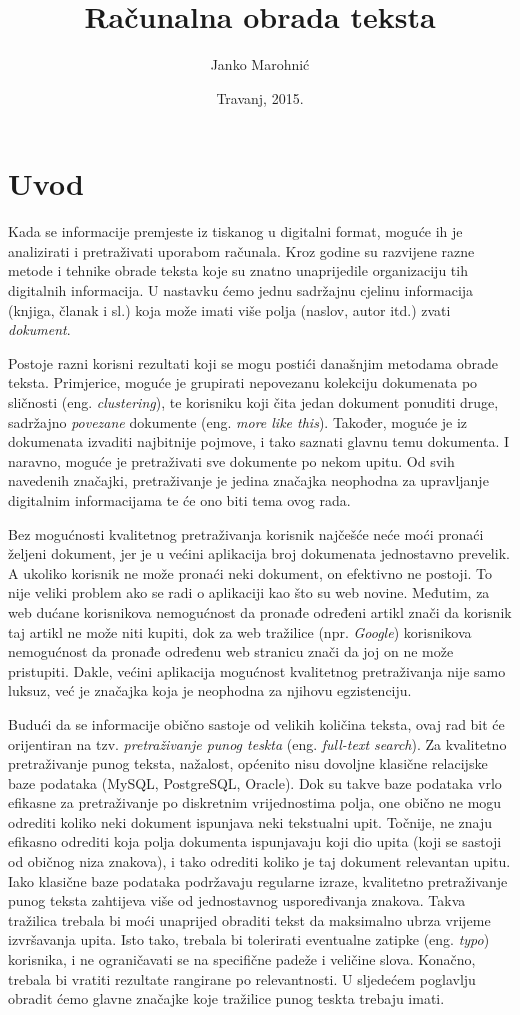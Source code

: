 \documentclass[a4paper,twoside,12pt]{scrreprt}
\title{Računalna obrada teksta}
\author{Janko Marohnić}
\date{Travanj, 2015.}
\begin{document}
\frontmatter

\chapter{Uvod}

Kada se informacije premjeste iz tiskanog u digitalni format, moguće ih je analizirati i pretraživati uporabom računala. Kroz godine su razvijene razne metode i tehnike obrade teksta koje su znatno unaprijedile organizaciju tih digitalnih informacija. U nastavku ćemo jednu sadržajnu cjelinu informacija (knjiga, članak i sl.) koja može imati više polja (naslov, autor itd.) zvati \textit{dokument}.

Postoje razni korisni rezultati koji se mogu postići današnjim metodama obrade teksta. Primjerice, moguće je grupirati nepovezanu kolekciju dokumenata po sličnosti (eng. \textit{clustering}), te korisniku koji čita jedan dokument ponuditi druge, sadržajno \textit{povezane} dokumente (eng. \textit{more like this}). Također, moguće je iz dokumenata izvaditi najbitnije pojmove, i tako saznati glavnu temu dokumenta. I naravno, moguće je pretraživati sve dokumente po nekom upitu. Od svih navedenih značajki, pretraživanje je jedina značajka neophodna za upravljanje digitalnim informacijama te će ono biti tema ovog rada.

Bez mogućnosti kvalitetnog pretraživanja korisnik najčešće neće moći pronaći željeni dokument, jer je u većini aplikacija broj dokumenata jednostavno prevelik. A ukoliko korisnik ne može pronaći neki dokument, on efektivno ne postoji. To nije veliki problem ako se radi o aplikaciji kao što su web novine. Međutim, za web dućane korisnikova nemogućnost da pronađe određeni artikl znači da korisnik taj artikl ne može niti kupiti, dok za web tražilice (npr. \textit{Google}) korisnikova nemogućnost da pronađe određenu web stranicu znači da joj on ne može pristupiti. Dakle, većini aplikacija mogućnost kvalitetnog pretraživanja nije samo luksuz, već je značajka koja je neophodna za njihovu egzistenciju.

Budući da se informacije obično sastoje od velikih količina teksta, ovaj rad bit će orijentiran na tzv. \textit{pretraživanje punog teskta} (eng. \textit{full-text search}). Za kvalitetno pretraživanje punog teksta, nažalost, općenito nisu dovoljne klasične relacijske baze podataka (MySQL, PostgreSQL, Oracle). Dok su takve baze podataka vrlo efikasne za pretraživanje po diskretnim vrijednostima polja, one obično ne mogu odrediti koliko neki dokument ispunjava neki tekstualni upit. Točnije, ne znaju efikasno odrediti koja polja dokumenta ispunjavaju koji dio upita (koji se sastoji od običnog niza znakova), i tako odrediti koliko je taj dokument relevantan upitu. Iako klasične baze podataka podržavaju regularne izraze, kvalitetno pretraživanje punog teksta zahtijeva više od jednostavnog uspoređivanja znakova. Takva tražilica trebala bi moći unaprijed obraditi tekst da maksimalno ubrza vrijeme izvršavanja upita. Isto tako, trebala bi tolerirati eventualne zatipke (eng. \textit{typo}) korisnika, i ne ograničavati se na specifične padeže i veličine slova. Konačno, trebala bi vratiti rezultate rangirane po relevantnosti. U sljedećem poglavlju obradit ćemo glavne značajke koje tražilice punog teskta trebaju imati.
\end{document}
